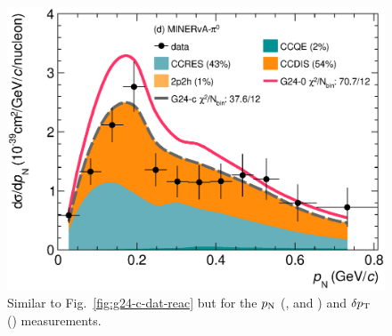 \begin{figure}
    \includegraphics[width=\dbfigwid\textwidth]{figures/tuning/0026-min_pi0_pn_reac_decomp_covfix.eps}
    \caption{\label{fig:g24-c-pn-reac}  
    Similar to Fig.~\ref{fig:g24-c-dat-reac} but for the $p_\textrm{N}$ (\ttkpip, \minzpi and \minpiz) and $\delta p_\textrm{T}$ (\ttkzpi) measurements. 
    } 
\end{figure}

